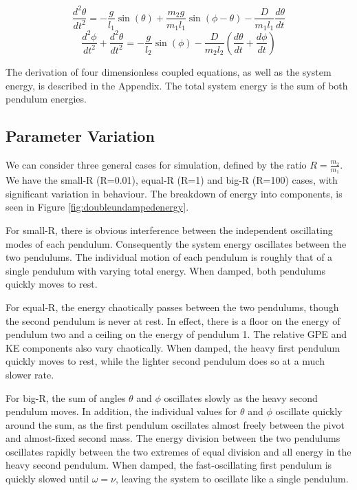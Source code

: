 \documentclass{article}
\begin{document}
\[ \frac{d^{2}\theta}{dt^{2}} = - \frac{g}{l_{1}} \sin(\theta) + \frac{m_{2}g}{m_{1}l_{1}}\sin(\phi-\theta)- \frac{D}{m_{1}l_{1}} \frac{d\theta}{dt} \]
\[ \frac{d^{2}\phi}{dt^{2}} + \frac{d^{2}\theta}{dt^{2}}= - \frac{g}{l_{2}} \sin(\phi) - \frac{D}{m_{2}l_{2}} (\frac{d\theta}{dt} + \frac{d\phi}{dt})\]

The derivation of four dimensionless coupled equations, as well as the system energy, is described in the Appendix. The total system energy is the sum of both pendulum energies.

\subsection{Parameter Variation}
We can consider three general cases for simulation, defined by the ratio $R=\frac{m_{2}}{m_{1}}$. We have the small-R (R=0.01), equal-R (R=1) and big-R (R=100) cases, with significant variation in behaviour. The breakdown of energy into components, is seen in Figure \ref{fig:doubleundampedenergy}. 

For small-R, there is obvious interference between the independent oscillating modes of each pendulum. Consequently the system energy oscillates between the two pendulums. The individual motion of each pendulum is roughly that of a single pendulum with varying total energy. When damped, both pendulums quickly moves to rest.

For equal-R, the energy chaotically passes between the two pendulums, though the second pendulum is never at rest. In effect, there is a floor on the energy of pendulum two and a ceiling on the energy of pendulum 1. The relative GPE and KE components also vary chaotically. When damped, the heavy first pendulum quickly moves to rest, while the lighter second pendulum does so at a much slower rate.

For big-R, the sum of angles $\theta$ and $\phi$ oscillates slowly as the heavy second pendulum moves. In addition, the individual values for $\theta$ and $\phi$ oscillate quickly around the sum, as the first pendulum oscillates almost freely between the pivot and almost-fixed second mass. The energy division between the two pendulums oscillates rapidly between the two extremes of equal division and all energy in the heavy second pendulum. When damped, the fast-oscillating first pendulum is quickly slowed until $\omega = \nu$, leaving the system to oscillate like a single pendulum.
\end{document}
